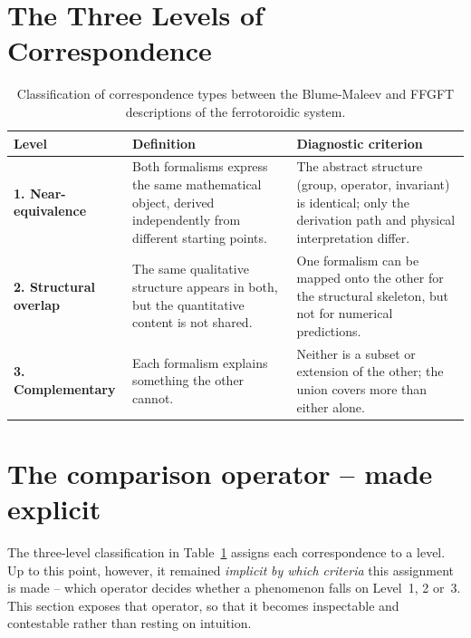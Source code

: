 \section{The Three Levels of Correspondence}

\begin{table}[htbp]
\centering
\caption{Classification of correspondence types between the
Blume-Maleev and FFGFT descriptions of the ferrotoroidic system.}
\label{tab:levels}
\begin{tabular}{p{2.5cm}p{5.5cm}p{5.5cm}}
\toprule
\textbf{Level} & \textbf{Definition} & \textbf{Diagnostic criterion} \\
\midrule
\textbf{1. Near-equivalence} &
  Both formalisms express the same mathematical object, derived
  independently from different starting points. &
  The abstract structure (group, operator, invariant) is identical;
  only the derivation path and physical interpretation differ. \\
\addlinespace
\textbf{2. Structural overlap} &
  The same qualitative structure appears in both, but the quantitative
  content is not shared. &
  One formalism can be mapped onto the other for the structural
  skeleton, but not for numerical predictions. \\
\addlinespace
\textbf{3. Complementary} &
  Each formalism explains something the other cannot. &
  Neither is a subset or extension of the other; the union covers
  more than either alone. \\
\bottomrule
\end{tabular}
\end{table}

\section{The comparison operator -- made explicit}

The three-level classification in Table~\ref{tab:levels} assigns each
correspondence to a level. Up to this point, however, it remained
\emph{implicit} \emph{by which criteria} this assignment is made -- which
operator decides whether a phenomenon falls on Level~1, 2 or~3. This
section exposes that operator, so that it becomes inspectable and
contestable rather than resting on intuition.

